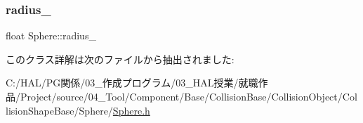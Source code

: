 \subsubsection{\texorpdfstring{radius\+\_\+}{radius\_}}
{\footnotesize\ttfamily float Sphere\+::radius\+\_\+}



このクラス詳解は次のファイルから抽出されました\+:\begin{DoxyCompactItemize}
\item 
C\+:/\+H\+A\+L/\+P\+G関係/03\+\_\+作成プログラム/03\+\_\+\+H\+A\+L授業/就職作品/\+Project/source/04\+\_\+\+Tool/\+Component/\+Base/\+Collision\+Base/\+Collision\+Object/\+Collision\+Shape\+Base/\+Sphere/\mbox{\hyperlink{_sphere_8h}{Sphere.\+h}}\end{DoxyCompactItemize}
